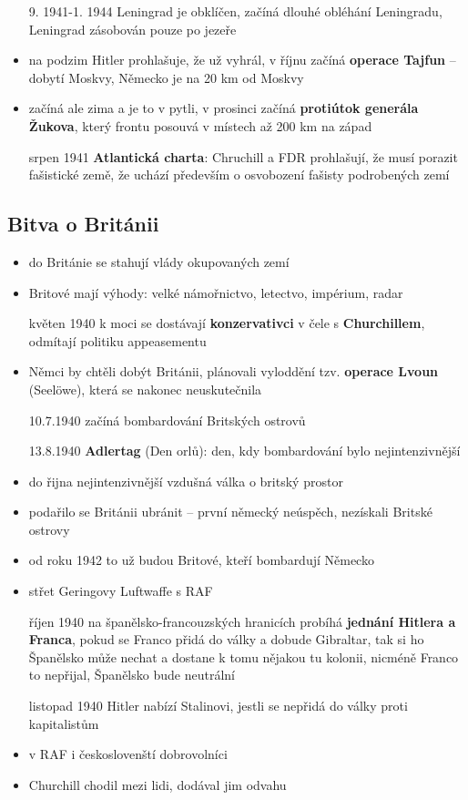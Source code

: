\documentclass{article}
\begin{document}
\begin{itemize}
    \item[9. 1941-1. 1944] Leningrad je obklíčen, začíná dlouhé obléhání Leningradu, Leningrad zásobován pouze po jezeře
    \item na podzim Hitler prohlašuje, že už vyhrál, v říjnu začíná \textbf{operace Tajfun} -- dobytí Moskvy, Německo je na 20 km od Moskvy
    \item začíná ale zima a je to v pytli, v prosinci začíná \textbf{protiútok generála Žukova}, který frontu posouvá v místech až 200 km na západ
    \item[srpen 1941] \textbf{Atlantická charta}: Chruchill a FDR prohlašují, že musí porazit fašistické země, že uchází především o osvobození fašisty podrobených zemí
\end{itemize}

\subsection*{Bitva o Británii}
\begin{itemize}
    \item do Británie se stahují vlády okupovaných zemí
    \item Britové mají výhody: velké námořnictvo, letectvo, impérium, radar
    \item[květen 1940] k moci se dostávají
    \textbf{konzervativci} v čele s \textbf{Churchillem}, odmítají politiku appeasementu
    \item Němci by chtěli dobýt Británii, plánovali vyloddění tzv. \textbf{operace Lvoun} (Seelöwe), která se nakonec neuskutečnila
    \item[10.7.1940] začíná bombardování Britských ostrovů
    \item[13.8.1940] \textbf{Adlertag} (Den orlů): den, kdy bombardování bylo nejintenzivnější
    \item do řijna nejintenzivnější vzdušná válka o britský prostor
    \item podařilo se Británii ubránit -- první německý neúspěch, nezískali Britské ostrovy
    \item od roku 1942 to už budou Britové, kteří bombardují Německo
    \item střet Geringovy Luftwaffe s RAF
    \item[říjen 1940] na španělsko-francouzských hranicích probíhá \textbf{jednání Hitlera a Franca}, pokud se Franco přidá do války a dobude Gibraltar, tak si ho Španělsko může nechat a dostane k tomu nějakou tu kolonii, nicméně Franco to nepřijal, Španělsko bude neutrální
    \item[listopad 1940] Hitler nabízí Stalinovi, jestli se nepřidá do války proti kapitalistům
    \item v RAF i českoslovenští dobrovolníci
    \item Churchill chodil mezi lidi, dodával jim odvahu
\end{itemize}
\end{document}
